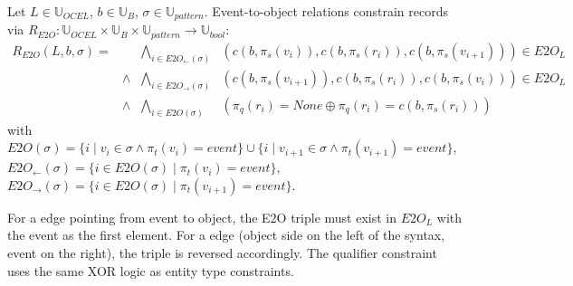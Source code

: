 \begin{frameddef}
Let $L \in \mathbb{U}_{OCEL}$, $b \in \mathbb{U}_B$, $\sigma \in \mathbb{U}_{pattern}$. Event-to-object relations constrain records via $R_{E2O} : \mathbb{U}_{OCEL} \times \mathbb{U}_B \times \mathbb{U}_{pattern} \to \mathbb{U}_{bool}$:
\[
\begin{array}{rrrl}
R_{E2O}(L, b, \sigma) = & & \displaystyle \bigwedge_{i \in E2O_{\leftarrow}(\sigma)} & (c(b, \pi_s(v_i)), c(b, \pi_s(r_i)), c(b, \pi_s(v_{i+1}))) \in E2O_L \\
& \land & \displaystyle \bigwedge_{i \in E2O_{\rightarrow}(\sigma)} & (c(b, \pi_s(v_{i+1})), c(b, \pi_s(r_i)), c(b, \pi_s(v_i))) \in E2O_L \\
& \land & \displaystyle \bigwedge_{i \in E2O(\sigma)} & (\pi_q(r_i) = None \oplus \pi_q(r_i) = c(b, \pi_s(r_i)))
\end{array}
\]
with $E2O(\sigma) = \{ i \mid v_i \in \sigma \land \pi_t(v_i) = event \} \cup \{ i \mid v_{i+1} \in \sigma \land \pi_t(v_{i+1}) = event \}$, $E2O_{\leftarrow}(\sigma) = \{ i \in E2O(\sigma) \mid \pi_t(v_i) = event \}$, $E2O_{\rightarrow}(\sigma) = \{ i \in E2O(\sigma) \mid \pi_t(v_{i+1}) = event \}$.
\end{frameddef}

For a  edge pointing from event to object, the E2O triple must exist in $E2O_L$ with the event as the first element. For a  edge (object side on the left of the syntax, event on the right), the triple is reversed accordingly. The qualifier constraint uses the same XOR logic as entity type constraints.

